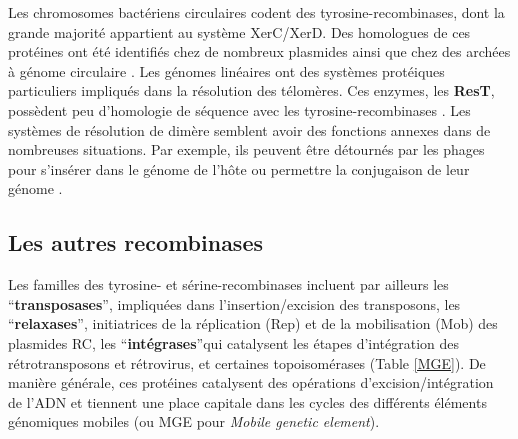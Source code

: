 	Les chromosomes bactériens circulaires codent des tyrosine-recombinases, dont la grande majorité appartient au système XerC/XerD. Des homologues de ces protéines ont été identifiés chez de nombreux plasmides ainsi que chez des archées à génome circulaire \citep{hallet2004dna}. Les génomes linéaires ont des systèmes protéiques particuliers impliqués dans la résolution des télomères. Ces enzymes, les \textbf{ResT}, possèdent peu d'homologie de séquence avec les tyrosine-recombinases \citep{chaconas2005replication}. Les systèmes de résolution de dimère semblent avoir des fonctions annexes dans de nombreuses situations. Par exemple, ils peuvent être détournés par les phages pour s'insérer dans le génome de l'hôte ou permettre la conjugaison de leur génome \citep{Das2013,hallet2004dna} .
 
 
\subsection{Les autres recombinases}\label{parmge}
	Les familles des tyrosine- et sérine-recombinases incluent par ailleurs les “\textbf{transposases}”, impliquées dans l'insertion/excision des transposons, les “\textbf{relaxases}”, initiatrices de la réplication (Rep) et de la mobilisation (Mob) des plasmides RC, les “\textbf{intégrases}”qui catalysent les étapes d'intégration des rétrotransposons et rétrovirus, et certaines topoisomérases (Table \ref{MGE}). De manière générale, ces protéines catalysent des opérations d'excision/intégration de l'ADN et tiennent une place capitale dans les cycles des différents éléments génomiques mobiles (ou MGE pour \textit{Mobile genetic element}). 

